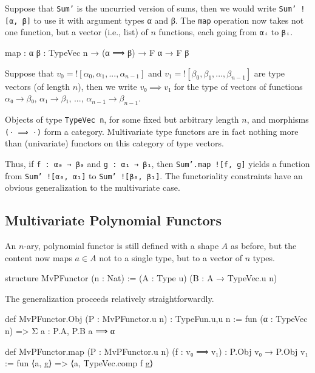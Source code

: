 \documentclass[titlepage]{report}
\newenvironment{remark}{%
\begin{framed}
\begin{trivlist}
    \item[\hskip \labelsep {\bfseries Remark:}]}%
{%
\end{trivlist}%
\end{framed}
}
\begin{document}
Suppose that \texttt{Sum'} is the uncurried version of sums, then we would write \texttt{Sum' ![α, β]} to use it with argument types α and β. The \texttt{map} operation now takes not one function, but a vector (i.e., list) of $n$ functions, each going from \texttt{αᵢ} to \texttt{βᵢ}. 

\begin{leancode}
    map : {α β : TypeVec n} → (α ⟹ β) → F α → F β
\end{leancode}
\begin{remark}
    Suppose that $v_0 = {!}[α_0, α_1, ..., α_{n-1}]$ and $v_1 = {!}[β_0, β_1, ..., β_{n-1}]$ are type vectors (of length $n$), then we write $v₀ ⟹ v₁$ for the type of vectors of functions $α₀ → β₀$, $α₁ → β₁$, ..., $α_{n-1} → β_{n-1}$.
\end{remark}
\begin{remark}
    Objects of type \texttt{TypeVec n}, for some fixed but arbitrary length $n$, and morphisms \texttt{(⋅ ⟹ ⋅)} form a category. 
    Multivariate type functors are in fact nothing more than (univariate) functors on this category of type vectors.
\end{remark}

Thus, if \texttt{f : α₀ → β₀} and \texttt{g : α₁ → β₁}, then \texttt{Sum'.map ![f, g]} yields a function from \texttt{Sum' ![α₀, α₁]} to \texttt{Sum' ![β₀, β₁]}.
The functoriality constraints have an obvious generalization to the multivariate case.

\subsection{Multivariate Polynomial Functors}
An $n$-ary, polynomial functor is still defined with a shape $A$ as before, but the content now maps $a ∈ A$ not to a single type, but to a vector of $n$ types.

\begin{leancode}
    structure MvPFunctor (n : Nat) := (A : Type u) (B : A → TypeVec.{u} n)
\end{leancode}

The generalization proceeds relatively straightforwardly.
\begin{leancode}
    def MvPFunctor.Obj (P : MvPFunctor.{u} n) : TypeFun.{u,u} n
        := fun (α : TypeVec n) => Σ a : P.A, P.B a ⟹ α

    def MvPFunctor.map  (P : MvPFunctor.{u} n) 
                        (f : v₀ ⟹ v₁) 
                            : P.Obj v₀ → P.Obj v₁ 
        := fun ⟨a, g⟩ => ⟨a, TypeVec.comp f g⟩
\end{leancode}
\end{document}
